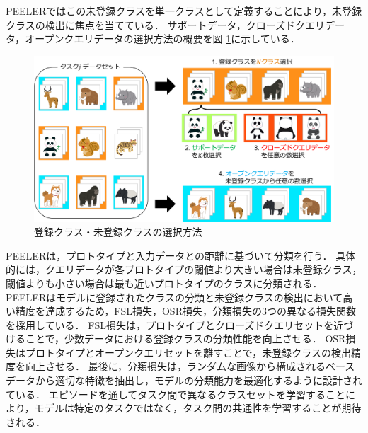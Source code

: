 PEELERではこの未登録クラスを単一クラスとして定義することにより，未登録クラスの検出に焦点を当てている．
サポートデータ，クローズドクエリデータ，オープンクエリデータの選択方法の概要を図 \ref{fig:peeler_data}に示している．
% 
\begin{figure}[tbp]
  \centering
  \includegraphics[width=\linewidth, keepaspectratio]{image/meta-class.png}
  \caption{登録クラス・未登録クラスの選択方法}
  \label{fig:peeler_data}
\end{figure}
%
PEELERは，プロトタイプと入力データとの距離に基づいて分類を行う．
具体的には，クエリデータが各プロトタイプの閾値より大きい場合は未登録クラス，閾値よりも小さい場合は最も近いプロトタイプのクラスに分類される．
PEELERはモデルに登録されたクラスの分類と未登録クラスの検出において高い精度を達成するため，FSL損失，OSR損失，分類損失の3つの異なる損失関数を採用している．
FSL損失は，プロトタイプとクローズドクエリセットを近づけることで，少数データにおける登録クラスの分類性能を向上させる．
OSR損失はプロトタイプとオープンクエリセットを離すことで，未登録クラスの検出精度を向上させる．
最後に，分類損失は，ランダムな画像から構成されるベースデータから適切な特徴を抽出し，モデルの分類能力を最適化するように設計されている．
エピソードを通してタスク間で異なるクラスセットを学習することにより，モデルは特定のタスクではなく，タスク間の共通性を学習することが期待される．

